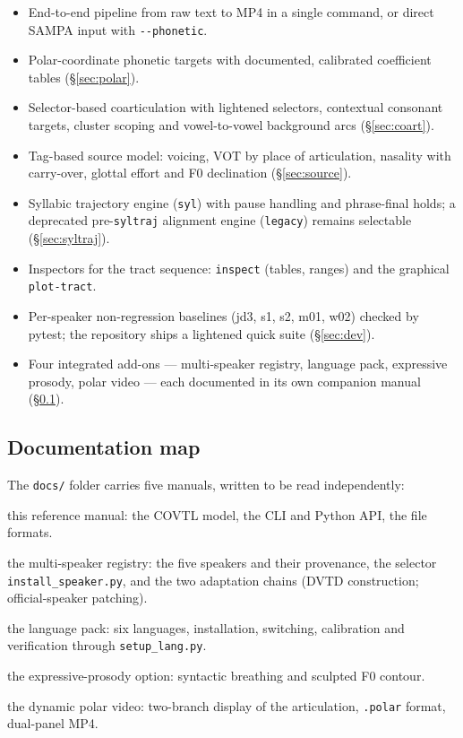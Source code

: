 \documentclass[11pt,a4paper]{article}
\begin{document}
\begin{itemize}[leftmargin=1.5em]
\item End-to-end pipeline from raw text to MP4 in a single command, or
      direct SAMPA input with \texttt{-{}-phonetic}.
\item Polar-coordinate phonetic targets with documented, calibrated
      coefficient tables (\S\ref{sec:polar}).
\item Selector-based coarticulation with lightened selectors, contextual
      consonant targets, cluster scoping and vowel-to-vowel background
      arcs (\S\ref{sec:coart}).
\item Tag-based source model: voicing, VOT by place of articulation,
      nasality with carry-over, glottal effort and F0 declination
      (\S\ref{sec:source}).
\item Syllabic trajectory engine (\texttt{syl}) with pause handling and
      phrase-final holds; a deprecated pre-\texttt{syltraj} alignment
      engine (\texttt{legacy}) remains selectable (\S\ref{sec:syltraj}).
\item Inspectors for the tract sequence: \texttt{inspect} (tables,
      ranges) and the graphical \texttt{plot-tract}.
\item Per-speaker non-regression baselines (jd3, s1, s2, m01, w02)
      checked by pytest; the repository ships a lightened quick suite
      (\S\ref{sec:dev}).
\item Four integrated add-ons --- multi-speaker registry, language
      pack, expressive prosody, polar video --- each documented in its
      own companion manual (\S\ref{subsec:docmap}).
\end{itemize}

\subsection{Documentation map}\label{subsec:docmap}

The \texttt{docs/} folder carries five manuals, written to be read
independently:

\begin{description}[leftmargin=2em]
\item[\texttt{manual.pdf}] this reference manual: the COVTL model,
      the CLI and Python API, the file formats.
\item[\texttt{speakers.pdf}] the multi-speaker registry: the five
      speakers and their provenance, the selector
      \texttt{install\_speaker.py}, and the two adaptation chains
      (DVTD construction; official-speaker patching).
\item[\texttt{language\_pack.pdf}] the language pack: six languages,
      installation, switching, calibration and verification through
      \texttt{setup\_lang.py}.
\item[\texttt{expressive\_prosody.pdf}] the expressive-prosody
      option: syntactic breathing and sculpted F0 contour.
\item[\texttt{polar\_visualization.pdf}] the dynamic polar video:
      two-branch display of the articulation, \texttt{.polar}
      format, dual-panel MP4.
\end{description}
\end{document}
